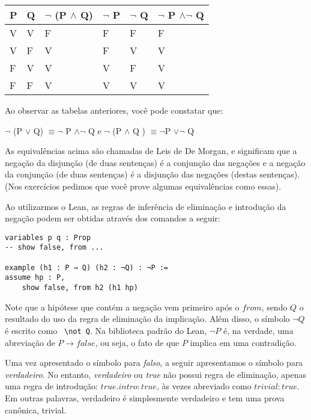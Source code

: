 \begin{table}[htb]
\centering
\begin{tabular}{|l|l|l|l|l|l|}
\hline
\textbf{P} & \textbf{Q} & \textbf{$\neg$ (P $\land$ Q)} & \textbf{$\neg $ P} & \textbf{$\neg$ Q} & \textbf{$\neg$ P $\land \neg$ Q}
\\ \hline
V          & V          & F     &F      &F  &F    \\ \hline
V          & F          & V     &F      &V  &V   \\ \hline
F          & V          & V     &V      &F  &V    \\ \hline
F          & F          & V     &V      &V  &V    \\ \hline

\end{tabular}
\end{table}

Ao observar as tabelas anteriores, você pode constatar que:

$\neg$ (P $\lor$ Q) $\equiv \neg$ P $\land \neg$ Q e $\neg$ (P $\land$ Q ) $\equiv \neg $P $\lor \neg$ Q    

\bigbreak
As equivalências acima são chamadas de Leis de De Morgan, e significam que a negação da disjunção (de duas sentenças) é a conjunção das negações e a negação da conjunção (de duas sentenças) é a disjunção das negações (destas sentenças). (Nos exercícios pedimos que você prove algumas equivalências como essas). 

Ao utilizarmos o Lean, as regras de inferência de eliminação e introdução da negação podem ser obtidas através dos comandos a seguir: 

\begin{lstlisting} 
variables p q : Prop
-- show false, from ...

example (h1 : P → Q) (h2 : ¬Q) : ¬P :=
assume hp : P,
    show false, from h2 (h1 hp)
\end{lstlisting} 

Note que a hipótese que contém a negação vem primeiro após o $from $, sendo $Q$ o resultado do uso da regra de eliminação da implicação. Além disso, o símbolo $\neg Q$ é escrito como \verb| \not Q|. Na biblioteca padrão do Lean, $ \neg P$ é, na verdade, uma abreviação de $ P \rightarrow false $, ou seja, o fato de que $P$ implica em uma contradição.

Uma vez apresentado o símbolo para \textit{falso}, a seguir apresentamos o símbolo para \textit{verdadeiro}. No entanto,  \textit{verdadeiro} ou \textit{true} não possui regra de eliminação, apenas uma regra de introdução:
$true.intro: true$, às vezes abreviado como $trivial: true$. Em outras palavras, verdadeiro é simplesmente verdadeiro e tem uma prova canônica, trivial.
 
